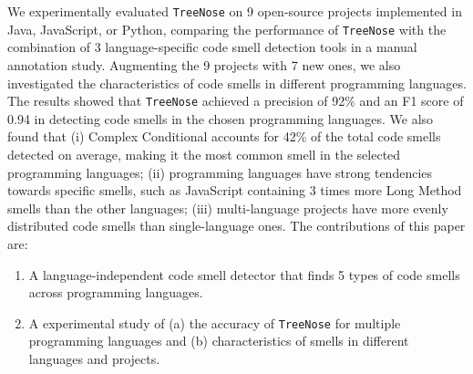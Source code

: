 We experimentally evaluated \texttt{TreeNose} on 9 open-source projects
implemented in Java, JavaScript, or Python, comparing the performance of
\texttt{TreeNose} with the combination of 3 language-specific code smell
detection tools in a manual annotation study. Augmenting the 9 projects with 7
new ones, we also investigated the characteristics of code smells in different
programming languages.
%
%
The results showed that \texttt{TreeNose} achieved a precision of 92\% and an F1
score of 0.94 in detecting code smells in the chosen programming languages. We
also found that (i) Complex Conditional accounts for 42\% of the total code
smells detected on average, making it the most common smell in the selected
programming languages; (ii) programming languages have strong tendencies towards
specific smells, such as JavaScript containing 3 times more Long Method smells
than the other languages; (iii) multi-language projects have more evenly
distributed code smells than single-language ones.
%
%
The contributions of this paper are:

\begin{enumerate}
    \item A language-independent code smell detector that finds 5 types of code
        smells across programming languages.
    \item A experimental study of (a) the accuracy of \texttt{TreeNose}
        for multiple programming languages and (b) characteristics of
        smells in different languages and projects.


\end{enumerate}
